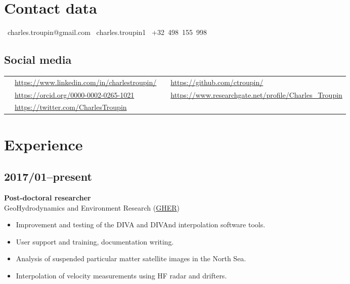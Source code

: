 \documentclass[11pt,a4paper,sans,svgnames]{article}
\begin{document}
\section{Contact data}

\faEnvelope~charles.troupin@gmail.com 	\hspace{1cm} \faSkype~charles.troupin1 \hspace{1cm} \faMobile~+32~498~155~998

\subsection{Social media}

\begin{tabular}{L{.02\textwidth}L{.42\textwidth}L{.02\textwidth}L{.5\textwidth}}
\faLinkedinSquare 	& \url{https://www.linkedin.com/in/charlestroupin/}		& \faGithubSquare	& \url{https://github.com/ctroupin/} \\
\aiOrcidSquare 		& \url{https://orcid.org/0000-0002-0265-1021} 	& \aiResearchGateSquare &\url{https://www.researchgate.net/profile/Charles_Troupin}\\
\faTwitterSquare	& \url{https://twitter.com/CharlesTroupin}		&  	& \\
\end{tabular}


\section{Experience}

\subsection{2017/01--present}
\textbf{Post-doctoral researcher}\\
GeoHydrodynamics and Environment Research (\href{http://modb.oce.ulg.ac.be/}{GHER})
\begin{itemize}%
\item Improvement and testing of the DIVA and DIVAnd interpolation software tools.
\item User support and training, documentation writing.
\item Analysis of suspended particular matter satellite images in the North Sea.
\item Interpolation of velocity measurements using HF radar and drifters.
\end{itemize}
\end{document}
